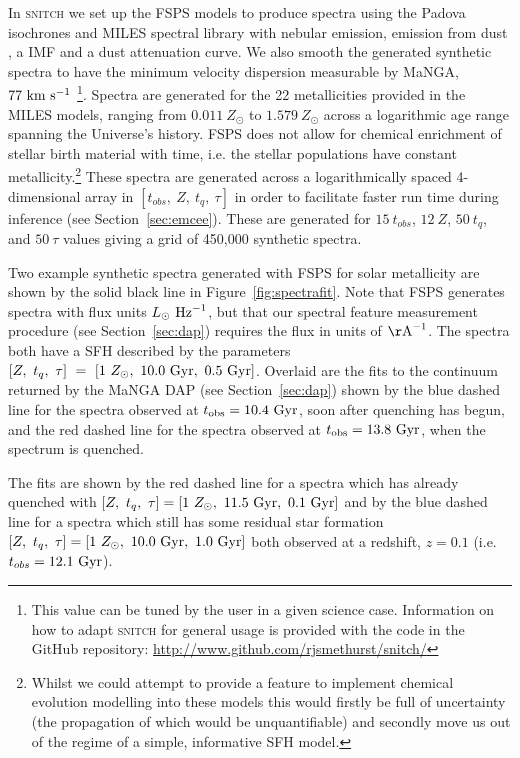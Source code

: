 \documentclass[useAMS,usenatbib]{mn2e}
\begin{document}
In \textsc{snitch} we set up the FSPS models to produce spectra using the Padova isochrones \citep{girardi02} and MILES spectral library \citep{vazdekis16} with nebular emission, emission from dust \cite{draineli07}, a \cite{chabrier03} IMF and a \cite{calzetti00} dust attenuation curve. We also smooth the generated synthetic spectra to have the minimum velocity dispersion measurable by MaNGA, $77~\rm{km}~{s}^{-1}$ \citep{bundy15}\footnote{This value can be tuned by the user in a given science case. Information on how to adapt \textsc{snitch} for general usage is provided with the code in the GitHub repository: \url{http://www.github.com/rjsmethurst/snitch/}}. Spectra are generated for the 22 metallicities provided in the MILES models, ranging from $0.011~Z_{\odot}$ to $1.579~Z_{\odot}$ across a logarithmic age range spanning the Universe's history. FSPS does not allow for chemical enrichment of stellar birth material with time, i.e. the stellar populations have constant metallicity.\footnote{Whilst we could attempt to provide a feature to implement chemical evolution modelling into these models this would firstly be full of uncertainty (the propagation of which would be unquantifiable) and secondly move us out of the regime of a simple, informative SFH model.} These spectra are generated across a logarithmically spaced 4-dimensional array in $[t_{obs},~Z,~t_q,~\tau]$ in order to facilitate faster run time during inference (see Section~\ref{sec:emcee}). These are generated for $15~t_{obs}$, $12~Z$, $50~t_q$, and $50~\tau$ values giving a grid of 450,000 synthetic spectra.

Two example synthetic spectra generated with FSPS for solar metallicity are shown by the solid black line in Figure~\ref{fig:spectrafit}. Note that FSPS generates spectra with flux units $L_{\odot}~\rm{Hz}^{-1}$, but that our spectral feature measurement procedure (see Section~\ref{sec:dap}) requires the flux in units of $\rm{\AA}^{-1}$. The spectra both have a SFH described by the parameters $[Z,~t_q,~\tau]~=~[1~Z_{\odot},~10.0~\rm{Gyr},~0.5~\rm{Gyr}]$. Overlaid are the fits to the continuum returned by the MaNGA DAP (see Section~\ref{sec:dap}) shown by the blue dashed line for the spectra observed at $t_{\rm{obs}} = 10.4~\rm{Gyr}$, soon after quenching has begun, and the red dashed line for the spectra observed at $t_{\rm{obs}} = 13.8~\rm{Gyr}$, when the spectrum is quenched.

 The fits are shown by the red dashed line for a spectra which has already quenched with $[Z,~t_q,~\tau] = [1~Z_{\odot},~11.5~\rm{Gyr},~0.1~\rm{Gyr}]$ and by the blue dashed line for a spectra which still has some residual star formation $[Z,~t_q,~\tau] = [1~Z_{\odot},~10.0~\rm{Gyr},~1.0~\rm{Gyr}]$ both observed at a redshift, $z=0.1$ (i.e. $t_{obs}=12.1~\rm{Gyr}$). 
\end{document}
